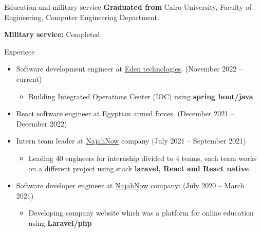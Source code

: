 \documentclass{resume}
\begin{document}

\begin{rSection}{Education and military service}
  \textbf{Graduated from} Cairo University, Faculty of Engineering, Computer Engineering Department.

  \textbf{Military service:} Completed.

\end{rSection}


\begin{rSection}{Experiece}
  \begin{itemize}
    \item Software development engineer at \href{https://www.linkedin.com/company/edentech2/mycompany/}{Eden technologies}. \hfill{(November 2022 – current)}
          \begin{itemize}
            \item Building Integrated Operations Center (IOC) using \textbf{spring boot/java}.
          \end{itemize}
    \item React software engineer at Egyptian armed forces. \hfill{(December 2021 – December 2022)}
    \item Intern team leader at \href{https://najahnow.net}{NajahNow} company \hfill{(July 2021 – September 2021)}
          \begin{itemize}
            \item Leading 40 engineers for internship divided to 4 teams, 
            each team works on a different project using stack \textbf{laravel, React and React native}
          \end{itemize}

    \item Software developer engineer at \href{https://najahnow.net}{NajahNow} company: \hfill{(July 2020 – March 2021)}
          \begin{itemize}
            \item Developing company website which was a platform for online education using \textbf{Laravel/php}
          \end{itemize}
  \end{itemize}
\end{rSection}
\end{document}
